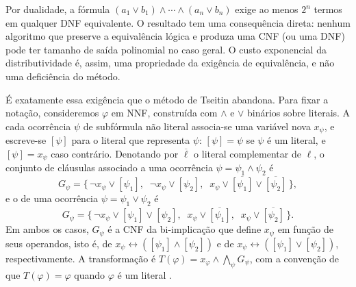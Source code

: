 \documentclass[12pt,a4paper,oneside]{report}
\theoremstyle{tituloplain}
\theoremstyle{titulodef}
\begin{document}
Por dualidade, a fórmula $(a_1\vee b_1)\wedge\cdots\wedge(a_n\vee b_n)$ exige ao menos $2^n$ termos em qualquer DNF equivalente. O resultado tem uma consequência direta: nenhum algoritmo que preserve a equivalência lógica e produza uma CNF (ou uma DNF) pode ter tamanho de saída polinomial no caso geral. O custo exponencial da distributividade é, assim, uma propriedade da exigência de equivalência, e não uma deficiência do método.
 
É exatamente essa exigência que o método de Tseitin abandona. Para fixar a notação, consideremos $\varphi$ em NNF, construída com $\wedge$ e $\vee$ binários sobre literais. A cada ocorrência $\psi$ de subfórmula não literal associa-se uma variável nova $x_\psi$, e escreve-se $[\psi]$ para o literal que representa $\psi$: $[\psi]=\psi$ se $\psi$ é um literal, e $[\psi]=x_\psi$ caso contrário. Denotando por $\overline{\ell}$ o literal complementar de $\ell$, o conjunto de cláusulas associado a uma ocorrência $\psi=\psi_1\wedge\psi_2$ é
\[
G_\psi=\bigl\{\,\neg x_\psi\vee[\psi_1],\;\; \neg x_\psi\vee[\psi_2],\;\; x_\psi\vee\overline{[\psi_1]}\vee\overline{[\psi_2]}\,\bigr\},
\]
e o de uma ocorrência $\psi=\psi_1\vee\psi_2$ é
\[
G_\psi=\bigl\{\,\neg x_\psi\vee[\psi_1]\vee[\psi_2],\;\; x_\psi\vee\overline{[\psi_1]},\;\; x_\psi\vee\overline{[\psi_2]}\,\bigr\}.
\]
Em ambos os casos, $G_\psi$ é a CNF da bi-implicação que define $x_\psi$ em função de seus operandos, isto é, de $x_\psi\leftrightarrow([\psi_1]\wedge[\psi_2])$ e de $x_\psi\leftrightarrow([\psi_1]\vee[\psi_2])$, respectivamente. A transformação é $T(\varphi)=x_\varphi\wedge\bigwedge_\psi G_\psi$, com a convenção de que $T(\varphi)=\varphi$ quando $\varphi$ é um literal \cite{tseitin1968}.
 
\end{document}
